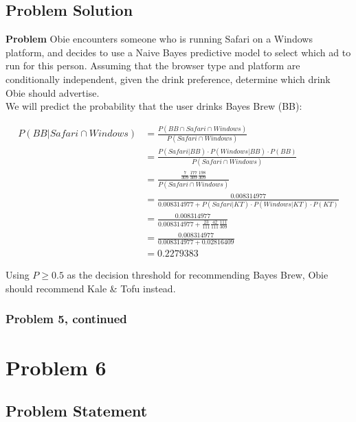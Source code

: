 \documentclass[12pt]{article}
\theoremstyle{definition}
\begin{document}
\newpage
\subsection*{Problem Solution}

\noindent
{\bf Problem} Obie encounters someone who is running Safari on a Windows platform, and decides to use a Naive Bayes predictive model to select which ad to run for this person. Assuming that the browser type and platform are conditionally independent, given the drink preference, determine which drink Obie should advertise.\\

We will predict the probability that the user drinks Bayes Brew (BB):

\begin{align*}
P(BB|Safari \cap Windows) &= \frac{P(BB \cap Safari \cap Windows)}{P(Safari \cap Windows)}\\
&= \frac{P(Safari|BB) \cdot P(Windows|BB) \cdot P(BB)}{P(Safari \cap Windows)}\\
&= \frac{\frac{7}{309}\frac{177}{309}\frac{198}{309}}{P(Safari \cap Windows)}\\
&= \frac{0.008314977}{0.008314977 + P(Safari|KT) \cdot P(Windows|KT) \cdot P(KT)}\\
&= \frac{0.008314977}{0.008314977 + \frac{23}{111} \frac{42}{111} \frac{111}{309}}\\
&= \frac{0.008314977}{0.008314977 + 0.02816409}\\
&= 0.2279383
\end{align*}

Using $P \geq 0.5$ as the decision threshold for recommending Bayes Brew, Obie should recommend Kale \& Tofu instead.

\newpage
\subsubsection*{Problem 5, continued}



\newpage
\section*{Problem 6}


\subsection*{Problem Statement}
\end{document}

